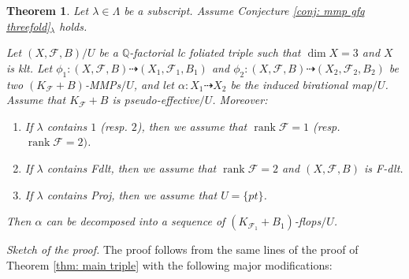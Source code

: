 \documentclass[preprint,12pt]{elsarticle}
\newcommand{\Qq}{\mathbb{Q}}
\newcommand{\rk}{\operatorname{rank}}
\newcommand{\Ff}{\mathcal{F}}
\newtheorem{thm}{Theorem}[section]
\begin{document}
\begin{thm}\label{thm: assume gfq mmp get flop connection}
Let $\lambda\in\Lambda$ be a subscript. Assume Conjecture \ref{conj: mmp gfq threefold}{$_\lambda$} holds. 

Let $(X,\Ff,B)/U$ be a $\Qq$-factorial lc foliated triple such that $\dim X=3$ and $X$ is klt. Let $\phi_1: (X,\Ff,B)\dashrightarrow (X_1,\Ff_1,B_1)$ and $\phi_2: (X,\Ff,B)\dashrightarrow (X_2,\Ff_2,B_2)$ be two $(K_{\Ff}+B)$-MMPs$/U$, and let $\alpha: X_1\dashrightarrow X_2$ be the induced birational map$/U$. Assume that $K_{\Ff}+B$ is pseudo-effective$/U$. Moreover:
\begin{enumerate}
    \item If $\lambda$ contains $1$ (resp. $2$), then we assume that $\rk\Ff=1$ (resp. $\rk\Ff=2)$.
    \item If $\lambda$ contains Fdlt, then we assume that $\rk\Ff=2$ and $(X,\Ff,B)$ is F-dlt.
    \item If $\lambda$ contains Proj, then we assume that $U=\{pt\}$.
\end{enumerate}
Then $\alpha$ can be decomposed into a sequence of $(K_{\Ff_1}+B_1)$-flops$/U$. 
\end{thm}
\noindent\textit{Sketch of the proof.} The proof follows from the same lines of the proof of Theorem \ref{thm: main triple} with the following major modifications:
\end{document}
